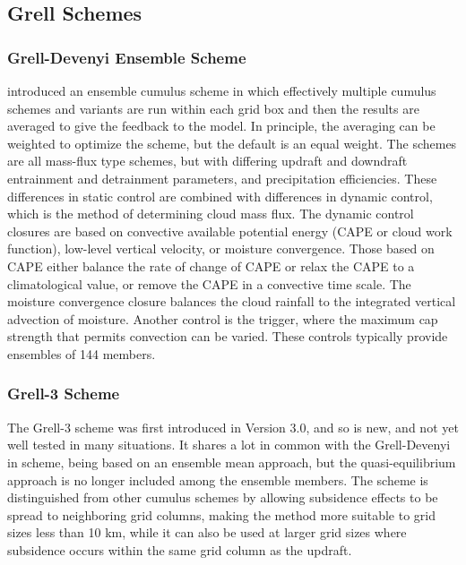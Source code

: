 \subsection{Grell Schemes}

\subsubsection{Grell-Devenyi Ensemble Scheme}

\citet{grell02} introduced an ensemble cumulus scheme 
in which effectively multiple cumulus schemes and variants are run 
within each grid box and then the results are averaged to give the 
feedback to the model. In principle, the averaging can be weighted 
to optimize the scheme, but the default is an equal weight. 
The schemes are all mass-flux type schemes, but with differing updraft 
and downdraft entrainment and detrainment parameters, and precipitation 
efficiencies. These differences in static control are combined with 
differences in dynamic control, which is the method of determining 
cloud mass flux. The dynamic control closures are based on convective 
available potential energy (CAPE or cloud work function), low-level 
vertical velocity, or moisture convergence. Those based on CAPE 
either balance the rate of change of CAPE or relax the CAPE to a 
climatological value, or remove the CAPE in a convective time scale. 
The moisture convergence closure balances the cloud rainfall to the 
integrated vertical advection of moisture. Another control
is the trigger, where the maximum cap strength that permits convection
can be varied. These controls typically provide ensembles of 144 members.

\subsubsection{Grell-3 Scheme}

The Grell-3 scheme was first introduced in Version 3.0, and so is
new, and not yet well tested in many situations. It shares a lot in
common with the Grell-Devenyi in scheme, being based on an ensemble mean
approach, but the quasi-equilibrium approach is no longer included
among the ensemble members. The scheme is distinguished from other
cumulus schemes by allowing subsidence effects to be spread to
neighboring grid columns, making the method more suitable to grid sizes
less than 10 km, while it can also be used at larger grid sizes where
subsidence occurs within the same grid column as the updraft. 

